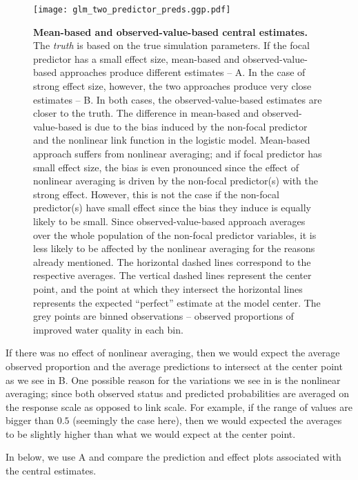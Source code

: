 \begin{figure}
\begin{center}
\texttt{[image: glm\_two\_predictor\_preds.ggp.pdf]}
\end{center}
\caption{{\bf Mean-based and observed-value-based central estimates.} The \emph{truth} is based on the true simulation parameters. If the focal predictor has a small effect size, mean-based and observed-value-based approaches produce different estimates -- A. In the case of strong effect size, however, the two approaches produce very close estimates -- B. In both cases, the observed-value-based estimates are closer to the truth. The difference in mean-based and observed-value-based is due to the bias induced by the non-focal predictor and the nonlinear link function in the logistic model. Mean-based approach suffers from nonlinear averaging; and if focal predictor has small effect size, the bias is even pronounced since the effect of nonlinear averaging is driven by the non-focal predictor(s) with the strong effect. However, this is not the case if the non-focal predictor(s) have small effect since the bias they induce is equally likely to be small. Since observed-value-based approach averages over the whole population of the non-focal predictor variables, it is less likely to be affected by the nonlinear averaging for the reasons already mentioned. The horizontal dashed lines correspond to the respective averages. The vertical dashed lines represent the center point, and the point at which they intersect the horizontal lines represents the expected ``perfect'' estimate at the model center. The grey points are binned observations -- observed proportions of improved water quality in each bin.} 
\label{fig:pred_bin_plots}
\end{figure}

If there was no effect of nonlinear averaging, then we would expect the average observed proportion and the average predictions to intersect at the center point as we see in B. One possible reason for the variations we see in  is the nonlinear averaging; since both observed status and predicted probabilities are averaged on the response scale as opposed to link scale. For example, if the range of values are bigger than $0.5$ (seemingly the case here), then we would expected the averages to be slightly higher than what we would expect at the center point.

In  below, we use A and compare the prediction and effect plots associated with the central estimates. 

